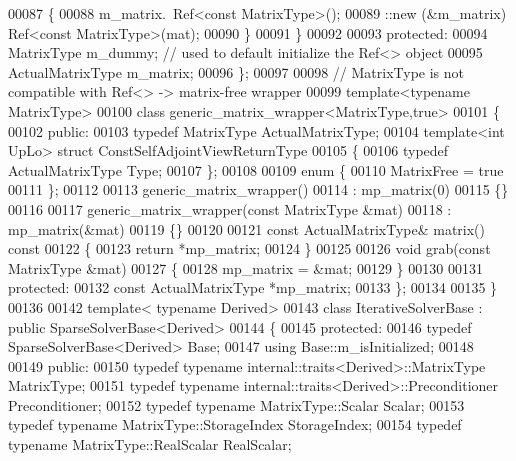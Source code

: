 \begin{DoxyCode}
00087     \{
00088       m\_matrix.~Ref<\textcolor{keyword}{const} MatrixType>();
00089       ::new (&m\_matrix) Ref<const MatrixType>(mat);
00090     \}
00091   \}
00092 
00093 \textcolor{keyword}{protected}:
00094   MatrixType m\_dummy; \textcolor{comment}{// used to default initialize the Ref<> object}
00095   ActualMatrixType m\_matrix;
00096 \};
00097 
00098 \textcolor{comment}{// MatrixType is not compatible with Ref<> -> matrix-free wrapper}
00099 \textcolor{keyword}{template}<\textcolor{keyword}{typename} MatrixType>
00100 \textcolor{keyword}{class }generic\_matrix\_wrapper<MatrixType,true>
00101 \{
00102 \textcolor{keyword}{public}:
00103   \textcolor{keyword}{typedef} MatrixType ActualMatrixType;
00104   \textcolor{keyword}{template}<\textcolor{keywordtype}{int} UpLo> \textcolor{keyword}{struct }ConstSelfAdjointViewReturnType
00105   \{
00106     \textcolor{keyword}{typedef} ActualMatrixType Type;
00107   \};
00108 
00109   \textcolor{keyword}{enum} \{
00110     MatrixFree = \textcolor{keyword}{true}
00111   \};
00112 
00113   generic\_matrix\_wrapper()
00114     : mp\_matrix(0)
00115   \{\}
00116 
00117   generic\_matrix\_wrapper(\textcolor{keyword}{const} MatrixType &mat)
00118     : mp\_matrix(&mat)
00119   \{\}
00120 
00121   \textcolor{keyword}{const} ActualMatrixType& matrix()\textcolor{keyword}{ const}
00122 \textcolor{keyword}{  }\{
00123     \textcolor{keywordflow}{return} *mp\_matrix;
00124   \}
00125 
00126   \textcolor{keywordtype}{void} grab(\textcolor{keyword}{const} MatrixType &mat)
00127   \{
00128     mp\_matrix = &mat;
00129   \}
00130 
00131 \textcolor{keyword}{protected}:
00132   \textcolor{keyword}{const} ActualMatrixType *mp\_matrix;
00133 \};
00134 
00135 \}
00136 
00142 \textcolor{keyword}{template}< \textcolor{keyword}{typename} Derived>
00143 \textcolor{keyword}{class }IterativeSolverBase : \textcolor{keyword}{public} SparseSolverBase<Derived>
00144 \{
00145 \textcolor{keyword}{protected}:
00146   \textcolor{keyword}{typedef} SparseSolverBase<Derived> Base;
00147   \textcolor{keyword}{using} Base::m\_isInitialized;
00148   
00149 \textcolor{keyword}{public}:
00150   \textcolor{keyword}{typedef} \textcolor{keyword}{typename} internal::traits<Derived>::MatrixType MatrixType;
00151   \textcolor{keyword}{typedef} \textcolor{keyword}{typename} internal::traits<Derived>::Preconditioner Preconditioner;
00152   \textcolor{keyword}{typedef} \textcolor{keyword}{typename} MatrixType::Scalar Scalar;
00153   \textcolor{keyword}{typedef} \textcolor{keyword}{typename} MatrixType::StorageIndex StorageIndex;
00154   \textcolor{keyword}{typedef} \textcolor{keyword}{typename} MatrixType::RealScalar RealScalar;

\end{DoxyCode}
